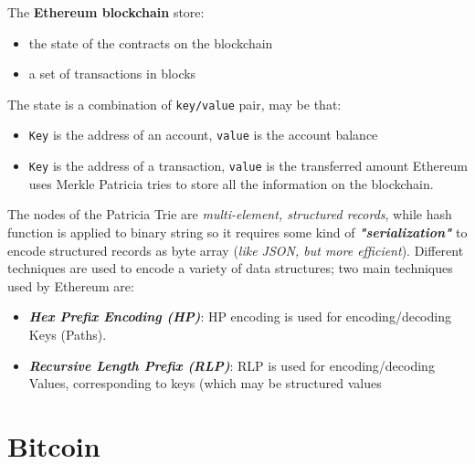\documentclass[10pt,a4paper]{report}
\begin{document}
The \textbf{Ethereum blockchain} store:
\begin{itemize}
	\item 
	the state of the contracts on the blockchain
	\item 
	a set of transactions in blocks
\end{itemize}


	The state is a combination of \texttt{key/value} pair, may be that:
\begin{itemize}
	\item 
	\texttt{Key} is the address of an account, \texttt{value} is the account balance
	\item 
	\texttt{Key} is the address of a transaction, \texttt{value} is the transferred amount
	Ethereum uses Merkle Patricia tries to store all the information on the blockchain.
\end{itemize}

The nodes of the Patricia Trie are \textit{multi-element, structured records}, while hash function is applied to binary string  so it requires some kind of \textit{\textbf{"serialization"}} to encode structured records as byte array (\textit{like JSON, but more efficient}).
Different techniques are used to encode a variety of data structures; two main techniques used by Ethereum are:
\begin{itemize}
	\item 
	\textit{\textbf{Hex Prefix Encoding (HP)}}: HP encoding is used for encoding/decoding Keys (Paths).
	\item 
	\textit{\textbf{Recursive Length Prefix (RLP)}}:  RLP is used for encoding/decoding Values, corresponding to keys (which may be structured values
\end{itemize}

\chapter{Bitcoin}
\end{document}
